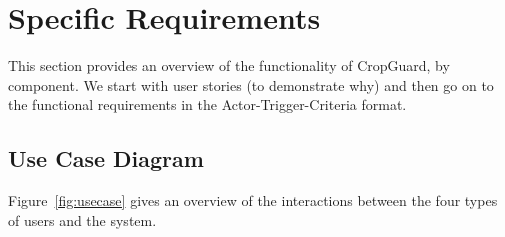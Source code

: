 \documentclass[12pt,a4paper]{article}
\begin{document}
\section{Specific Requirements}

This section provides an overview of the functionality of CropGuard, by component. We start with user stories (to demonstrate why) and then go on to the functional requirements in the Actor-Trigger-Criteria format.

\subsection{Use Case Diagram}

Figure~\ref{fig:usecase} gives an overview of the interactions between the four types of users and the system.
\end{document}
